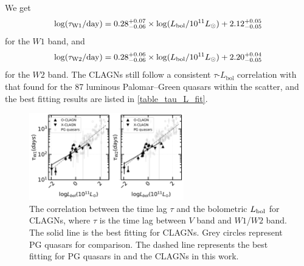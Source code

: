 \documentclass[linenumbers]{aastex631}
\begin{document}
We get \begin{equation}
\mathrm{log}(\tau_{\rm{W1}}/\mathrm{day})= 0.28^{+0.07}_{-0.06}\times \mathrm{log}(L_{\mathrm{bol}}/10^{11} L_{\odot})+ 2.12^{+0.05}_{-0.05}
\end{equation} for the $W1$ band, and 
\begin{equation}
\mathrm{log}(\tau_{\rm{W2}}/\mathrm{day})= 0.28^{+0.06}_{-0.06}\times \mathrm{log}(L_{\mathrm{bol}}/10^{11} L_{\odot})+ 2.20^{+0.04}_{-0.05}
\end{equation}for the $W2$ band. The CLAGNs still follow a consistent $\tau$-$L_{\mathrm{bol}}$ correlation with that found for the 87 luminous Palomar--Green quasars \citep[usually with $L_{\mathrm{bol}} \ge 10^{11}L_{\odot}$, see ][]{2019ApJ...886...33L} within the scatter, and the best fitting results are listed in \autoref{table_tau_L_fit}.




\begin{figure}[h!]
\centering
	\includegraphics[width=0.6\textwidth]{pic/tau_L_correlation_clagn_J_w1_w2.pdf}
    \caption{The correlation between the time lag $\tau$ and the bolometric $L_{\rm bol}$ for CLAGNs, where $\tau$ is the time lag between $V$ band and $W1$/$W2$ band. The solid line is the best fitting for CLAGNs. Grey circles represent PG quasars \citep{2019ApJ...886...33L} for comparison. The dashed line represents the best fitting for PG quasars in \citet{2019ApJ...886...33L} and the CLAGNs in this work. } 
    \label{fig:tau_L}
\end{figure}
\end{document}
